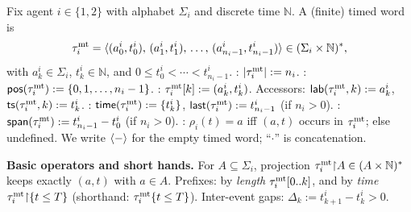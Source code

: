 \documentclass{article}
\begin{document}
  \begin{definition}
  Fix agent \(i\in\{1,2\}\) with alphabet \(\Sigma_i\) and discrete time \(\mathbb{N}\).
  A (finite) timed word is
  \[
  \tau^{\mathrm{mt}}_i=\langle (a^i_0,t^i_0),\,(a^i_1,t^i_1),\,\dots,\,(a^i_{n_i-1},t^i_{n_i-1}) \rangle 
  \in(\Sigma_i\times\mathbb{N})^{*},
  \]
  with \(a^i_k\in\Sigma_i\), \(t^i_k\in\mathbb{N}\), and \(0\le t^i_0<\cdots<t^i_{n_i-1}\).
  : \( |\tau^{\mathrm{mt}}_i| := n_i \). \;
  : \( \mathsf{pos}(\tau^{\mathrm{mt}}_i):=\{0,1,\dots,n_i-1\} \). \;
  : \(\tau^{\mathrm{mt}}_i[k] := (a^i_k,t^i_k)\).
  Accessors: \( \mathsf{lab}(\tau^{\mathrm{mt}}_i,k):=a^i_k\), \( \mathsf{ts}(\tau^{\mathrm{mt}}_i,k):=t^i_k \).
  : \( \mathsf{time}(\tau^{\mathrm{mt}}_i):=\{t^i_k\} \), \( \mathsf{last}(\tau^{\mathrm{mt}}_i):=t^i_{n_i-1} \) (if \(n_i>0\)).
  : \( \mathsf{span}(\tau^{\mathrm{mt}}_i):=t^i_{n_i-1}-t^i_0 \) (if \(n_i>0\)).
  :
  \( \rho_i(t)=a \) iff \((a,t)\) occurs in \(\tau^{\mathrm{mt}}_i\); else undefined.
  We write \(\langle - \rangle \) for the empty timed word; “\(\cdot\)” is concatenation.
  \end{definition}
  
  \noindent\textbf{Basic operators and short hands.}
  For \(A\subseteq\Sigma_i\), projection \( \tau^{\mathrm{mt}}_i{\upharpoonright}A\in(A\times\mathbb{N})^{*} \) keeps exactly \((a,t)\) with \(a\in A\).
  Prefixes: by \emph{length} \( \tau^{\mathrm{mt}}_i[0..k] \), and by \emph{time}
  \( \tau^{\mathrm{mt}}_i{\upharpoonright}\{t\le T\} \) (shorthand: \( \tau^{\mathrm{mt}}_i\{t\le T\}\)).
  Inter-event gaps: \( \Delta_k:=t^i_{k+1}-t^i_k>0\).
  
\end{document}
